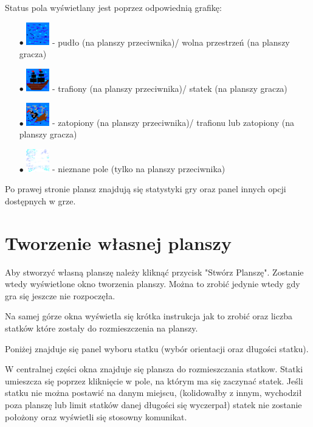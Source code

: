 \documentclass[a4paper]{article}
\begin{document}
Status pola wyświetlany jest poprzez odpowiednią grafikę:
\begin{itemize}
    \item[$\bullet$] \includegraphics[width=1cm, height=1cm]{water.png} - pudło (na planszy przeciwnika)/ wolna przestrzeń (na planszy gracza)
    \item[$\bullet$] \includegraphics[width=1cm, height=1cm]{ship.png} - trafiony (na planszy przeciwnika)/ statek (na planszy gracza)
    \item[$\bullet$] \includegraphics[width=1cm, height=1cm]{sunk.png} - zatopiony (na planszy przeciwnika)/ trafionu lub zatopiony (na planszy gracza)
    \item[$\bullet$] \includegraphics[width=1cm, height=1cm]{cloud.png} - nieznane pole (tylko na planszy przeciwnika)
\end{itemize}

Po prawej stronie plansz znajdują się statystyki gry oraz panel innych opcji dostępnych w grze.


\section{Tworzenie własnej planszy}
Aby stworzyć własną planszę należy kliknąć przycisk "Stwórz Planszę". Zostanie wtedy wyświetlone okno tworzenia planszy.
Można to zrobić jedynie wtedy gdy gra się jeszcze nie rozpoczęła.

Na samej górze okna wyświetla się krótka instrukcja jak to zrobić oraz liczba statków które zostały do rozmieszczenia na planszy.

Poniżej znajduje się panel wyboru statku (wybór orientacji oraz długości statku).

W centralnej części okna znajduje się plansza do rozmieszczania statkow. Statki umieszcza się poprzez kliknięcie w pole,
na którym ma się zaczynać statek. Jeśli statku nie można postawić na danym miejscu, (kolidowałby z innym, wychodził poza planszę
lub limit statków danej długości się wyczerpał) statek nie zostanie położony oraz wyświetli się stosowny komunikat.
\end{document}
